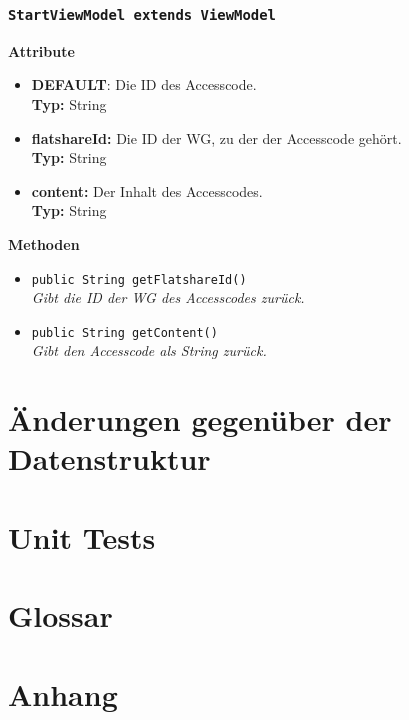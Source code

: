 \documentclass[a4paper]{scrreprt}
\begin{document}
	\subsection{\texttt{StartViewModel extends ViewModel}}
	\textbf{Attribute}
	\begin{itemize}
		\item \textbf{DEFAULT}: Die ID des Accesscode. \\
		\textbf{Typ:} String
		
		\item \textbf{flatshareId:} Die ID der WG, zu der der Accesscode gehört. \\
		\textbf{Typ:} String
		
		\item \textbf{content:} Der Inhalt des Accesscodes.\\
		\textbf{Typ:} String
	\end{itemize}
	
	\textbf{Methoden}
	\begin{itemize}
		\item{\texttt{public String getFlatshareId()}}\\
		\textit{Gibt die ID der WG des Accesscodes zurück.}\\
		\item{\texttt{public String getContent()}}\\
		\textit{Gibt den Accesscode als String zurück.}\\
	\end{itemize}
		
		\chapter{Änderungen gegenüber der Datenstruktur}
		
		\chapter{Unit Tests}
		
		
		\chapter{Glossar}
		
		\chapter{Anhang}
\end{document}
